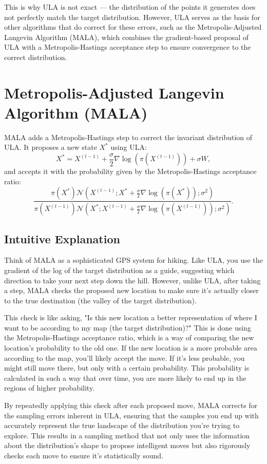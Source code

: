 \documentclass{article}
\begin{document}
This is why ULA is not exact — the distribution of the points it generates does not perfectly match the target distribution. However, ULA serves as the basis for other algorithms that do correct for these errors, such as the Metropolis-Adjusted Langevin Algorithm (MALA), which combines the gradient-based proposal of ULA with a Metropolis-Hastings acceptance step to ensure convergence to the correct distribution.

\section{Metropolis-Adjusted Langevin Algorithm (MALA)}
MALA adds a Metropolis-Hastings step to correct the invariant distribution of ULA. It proposes a new state \(X^\ast\) using ULA:
\[
X^\ast = X^{(t-1)} + \frac{\sigma}{2} \nabla \log(\pi(X^{(t-1)})) + \sigma W,
\]
and accepts it with the probability given by the Metropolis-Hastings acceptance ratio:
\[
\frac{\pi(X^\ast) \mathcal{N}(X^{(t-1)}; X^\ast + \frac{\sigma}{2} \nabla \log(\pi(X^\ast)); \sigma^2)}{\pi(X^{(t-1)}) \mathcal{N}(X^\ast; X^{(t-1)} + \frac{\sigma}{2} \nabla \log(\pi(X^{(t-1)})); \sigma^2)}.
\]

\subsection{Intuitive Explanation}
Think of MALA as a sophisticated GPS system for hiking. Like ULA, you use the gradient of the log of the target distribution as a guide, suggesting which direction to take your next step down the hill. However, unlike ULA, after taking a step, MALA checks the proposed new location to make sure it's actually closer to the true destination (the valley of the target distribution). 

This check is like asking, "Is this new location a better representation of where I want to be according to my map (the target distribution)?" This is done using the Metropolis-Hastings acceptance ratio, which is a way of comparing the new location's probability to the old one. If the new location is a more probable area according to the map, you'll likely accept the move. If it's less probable, you might still move there, but only with a certain probability. This probability is calculated in such a way that over time, you are more likely to end up in the regions of higher probability.

By repeatedly applying this check after each proposed move, MALA corrects for the sampling errors inherent in ULA, ensuring that the samples you end up with accurately represent the true landscape of the distribution you're trying to explore. This results in a sampling method that not only uses the information about the distribution's shape to propose intelligent moves but also rigorously checks each move to ensure it's statistically sound.
\end{document}
